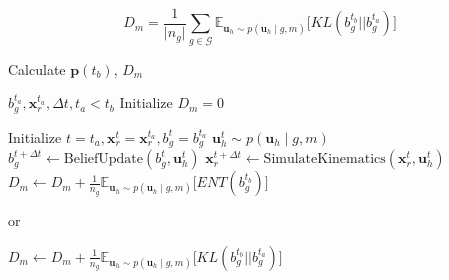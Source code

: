 \documentclass[conference]{IEEEtran}
\begin{document}
 \begin{equation}
 D_m = \frac{1}{\vert n_g \vert} \sum_{g \in \mathcal{G}}^{} \mathbb{E}_{\boldsymbol{u}_h \sim p(\boldsymbol{u}_h \; | \; g, m)}\Big[KL(b_g^{t_b}||b_g^{t_a})\Big]
 \end{equation}
% 
\begin{algorithm}[t]
	\caption{Calculate $\boldsymbol{p}(t_b)$, $D_m$}
	\label{alg:disamb}
	 \begin{algorithmic}[1]
	 	\REQUIRE $b^{t_a}_g, \boldsymbol{x}_r^{t_a}, \Delta t, t_a < t_b$
	 	\STATE Initialize $D_m = 0$
	 	
	 	\STATE Initialize $t = t_a, \boldsymbol{x}_r^{t} = \boldsymbol{x}_r^{t_a}, b^t_g = b^{t_a}_g$
	 	\STATE $\boldsymbol{u}_h^t \sim p(\boldsymbol{u}_h\;|\; g, m)$ 
	 	\STATE $b^{t + \Delta t}_g \leftarrow \text{BeliefUpdate}(b^t_g, \boldsymbol{u}_h^t)$
	 	\STATE $\boldsymbol{x}_r^{t + \Delta t}\leftarrow \text{SimulateKinematics}(\boldsymbol{x}_r^{t}, \boldsymbol{u}_h^t)$
	 	\ENDWHILE
	 	\STATE $D_m \leftarrow D_m + \frac{1}{n_g} \mathbb{E}_{\boldsymbol{u}_h \sim p(\boldsymbol{u}_h \; | \; g, m)}\Big[ENT(b_g^{t_b})\Big] $
	 	
	 	or
	 	
	 	\STATE $D_m \leftarrow D_m + \frac{1}{n_g} \mathbb{E}_{\boldsymbol{u}_h \sim p(\boldsymbol{u}_h \; | \; g, m)}\Big[KL(b_g^{t_b}||b_g^{t_a})\Big] $
	 	\ENDFOR
	 	\ENDFOR
	 \end{algorithmic}
\end{algorithm}
\end{document}
